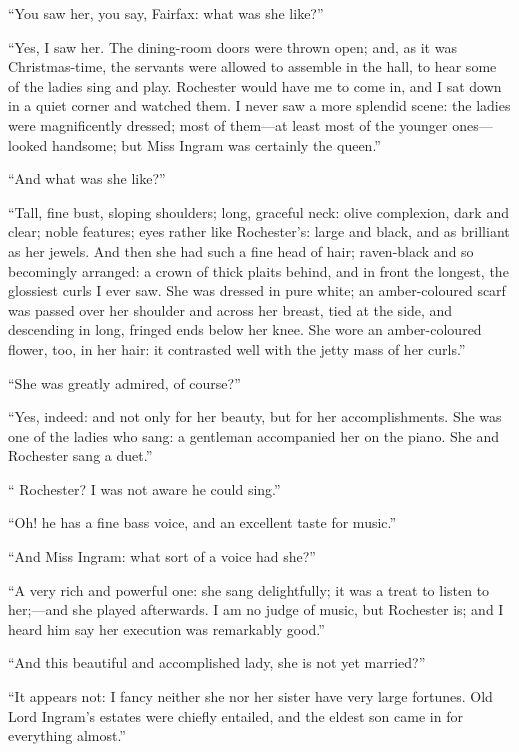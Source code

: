 \enquote{You saw her, you say, \Mrs{} Fairfax: what was she like?}

\enquote{Yes, I saw her.  The dining-room doors were thrown open; and,
as it was Christmas-time, the servants were allowed to assemble in the
hall, to hear some of the ladies sing and play.  \Mr{} Rochester would
have me to come in, and I sat down in a quiet corner and watched them. 
I never saw a more splendid scene: the ladies were magnificently
dressed; most of them---at least most of the younger ones---looked
handsome; but Miss Ingram was certainly the queen.}

\enquote{And what was she like?}

\enquote{Tall, fine bust, sloping shoulders; long, graceful neck: olive
complexion, dark and clear; noble features; eyes rather like \Mr{}
 Rochester's: large and black, and as brilliant as her jewels.  And then
she had such a fine head of hair; raven-black and so becomingly
arranged: a crown of thick plaits behind, and in front the longest, the
glossiest curls I ever saw.  She was dressed in pure white; an
amber-coloured scarf was passed over her shoulder and across her breast,
tied at the side, and descending in long, fringed ends below her knee. 
She wore an amber-coloured flower, too, in her hair: it contrasted well
with the jetty mass of her curls.}

\enquote{She was greatly admired, of course?}

\enquote{Yes, indeed: and not only for her beauty, but for her
accomplishments.  She was one of the ladies who sang: a gentleman
accompanied her on the piano.  She and \Mr{} Rochester sang a duet.}

\enquote{\Mr{} Rochester?  I was not aware he could sing.}

\enquote{Oh! he has a fine bass voice, and an excellent taste for
music.}

\enquote{And Miss Ingram: what sort of a voice had she?}

\enquote{A very rich and powerful one: she sang delightfully; it was a
treat to listen to her;---and she played afterwards.  I am no judge of
music, but \Mr{} Rochester is; and I heard him say her execution was
remarkably good.}

\enquote{And this beautiful and accomplished lady, she is not yet
married?}

\enquote{It appears not: I fancy neither she nor her sister have very
large fortunes.  Old Lord Ingram's estates were chiefly entailed, and
the eldest son came in for everything almost.}

